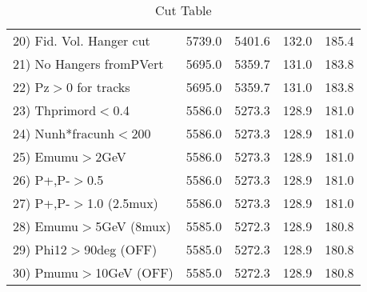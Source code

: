 \begin{table}[h!]
\begin{tabular}{||l||r|r|r|r||}
 20) Fid. Vol. Hanger cut &      5739.0 &      5401.6 &       132.0 &       185.4 \\
 21) No Hangers fromPVert &      5695.0 &      5359.7 &       131.0 &       183.8 \\
 22) Pz$>$0 for tracks    &      5695.0 &      5359.7 &       131.0 &       183.8 \\
 23) Thprimord$<$0.4      &      5586.0 &      5273.3 &       128.9 &       181.0 \\
 24) Nunh*fracunh$<$200   &      5586.0 &      5273.3 &       128.9 &       181.0 \\
 25) Emumu$>$2GeV         &      5586.0 &      5273.3 &       128.9 &       181.0 \\
 26) P+,P-$>$0.5          &      5586.0 &      5273.3 &       128.9 &       181.0 \\
 27) P+,P-$>$1.0 (2.5mux) &      5586.0 &      5273.3 &       128.9 &       181.0 \\
 28) Emumu$>$5GeV  (8mux) &      5585.0 &      5272.3 &       128.9 &       180.8 \\
 29) Phi12$>$90deg  (OFF) &      5585.0 &      5272.3 &       128.9 &       180.8 \\
 30) Pmumu$>$10GeV  (OFF) &      5585.0 &      5272.3 &       128.9 &       180.8 \\
 \hline
 \hline
 \end{tabular}
 \caption{Cut Table \cohpip }
 \label{tab-cut_copip}
 \end{table}
